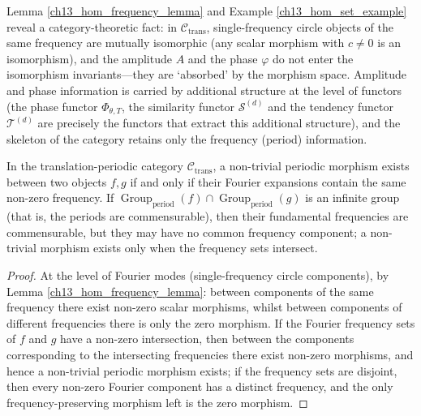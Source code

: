\begin{remark}\label{ch13_amplitude_phase_remark}
Lemma \ref{ch13_hom_frequency_lemma} and Example \ref{ch13_hom_set_example} reveal a category-theoretic fact: in $\mathcal{C}_{\text{trans}}$, single-frequency circle objects of the same frequency are mutually isomorphic (any scalar morphism with $c \neq 0$ is an isomorphism), and the amplitude $A$ and the phase $\varphi$ do not enter the isomorphism invariants---they are `absorbed' by the morphism space. Amplitude and phase information is carried by additional structure at the level of functors (the phase functor $\Phi_{\theta, T}$, the similarity functor $\mathcal{S}^{(d)}$ and the tendency functor $\mathcal{T}^{(d)}$ are precisely the functors that extract this additional structure), and the skeleton of the category retains only the frequency (period) information.
\end{remark}

\begin{proposition}\label{prop:translation_category_similarity}
In the translation-periodic category $\mathcal{C}_{\text{trans}}$, a non-trivial periodic morphism exists between two objects $f, g$ if and only if their Fourier expansions contain the same non-zero frequency. If $\operatorname{Group}_{\mathrm{period}}(f) \cap \operatorname{Group}_{\mathrm{period}}(g)$ is an infinite group (that is, the periods are commensurable), then their fundamental frequencies are commensurable, but they may have no common frequency component; a non-trivial morphism exists only when the frequency sets intersect.
\end{proposition}

\begin{proof}
At the level of Fourier modes (single-frequency circle components), by Lemma \ref{ch13_hom_frequency_lemma}: between components of the same frequency there exist non-zero scalar morphisms, whilst between components of different frequencies there is only the zero morphism. If the Fourier frequency sets of $f$ and $g$ have a non-zero intersection, then between the components corresponding to the intersecting frequencies there exist non-zero morphisms, and hence a non-trivial periodic morphism exists; if the frequency sets are disjoint, then every non-zero Fourier component has a distinct frequency, and the only frequency-preserving morphism left is the zero morphism.
\end{proof}

